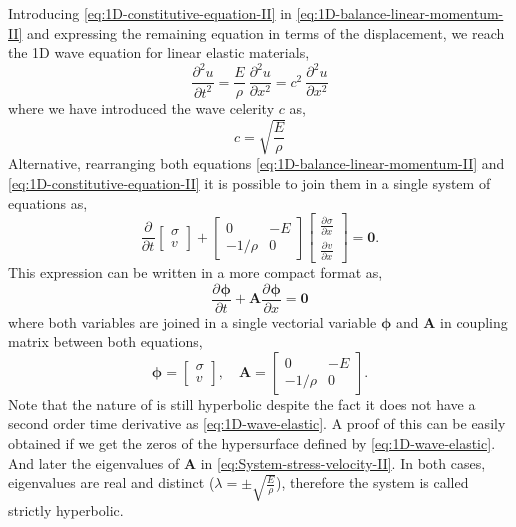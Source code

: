 \documentclass[preprint,12pt,a4paper]{elsarticle}
\newcommand{\Matrix}[1]{
  \ensuremath{\mathbf{{#1}}}
}
\newcommand{\Vector}[1]{
  \ensuremath{\mathbf{{#1}}}
}
\newcommand{\Deriv}[3][]{
  \ensuremath{\frac{\partial^{#1}{#2}}{ \partial {#3}^{#1} }}
}
\begin{document}
Introducing \eqref{eq:1D-constitutive-equation-II} in
\eqref{eq:1D-balance-linear-momentum-II} and expressing the remaining
equation in terms of the displacement, we reach the 1D wave
equation for linear elastic materials,
\begin{equation}
  \label{eq:1D-wave-elastic}
  \Deriv[2]{u}{t} = \frac{E}{\rho}\ \Deriv[2]{u}{x} = c^2\ \Deriv[2]{u}{x}
\end{equation}
where we have introduced the wave celerity $c$ as,
\begin{equation}
  \label{eq:1D-elastic-wave-celerity}
  c = \sqrt{\frac{E}{\rho}}
\end{equation}
Alternative, rearranging both equations
\eqref{eq:1D-balance-linear-momentum-II} and
\eqref{eq:1D-constitutive-equation-II} it is possible to join them in a
single system of equations as,
\begin{equation}
  \label{eq:System-stress-velocity}
  \Deriv{}{t} \left[
    \begin{array}{c}
      \sigma \\
      v
    \end{array}
  \right] + \left[
    \begin{array}{cc}
      0 & - E \\
      - 1/\rho & 0 
    \end{array} \right] \left[
    \begin{array}{c}
      \Deriv{\sigma}{x} \\
      \Deriv{v}{x}
    \end{array}
  \right] = \Vector{0}.
\end{equation}
This expression can be written in a more compact format as,
\begin{equation}
  \label{eq:System-stress-velocity-II}
  \Deriv{\Vector{\phi}}{t} + \Matrix{A}\Deriv{\Vector{\phi}}{x} = \Vector{0}
\end{equation}
where both variables are joined in a single vectorial variable
$\Vector{\phi}$ and $\Matrix{A}$ in coupling matrix between both equations,
\begin{equation*}
  \Vector{\phi} = \left[
    \begin{array}{c}
      \sigma \\
      v
    \end{array}
  \right],\quad 
  \Matrix{A} =  \left[
    \begin{array}{cc}
      0 & - E\\
      - 1/\rho & 0 
    \end{array} \right].
\end{equation*}
Note that the nature of \label{eq:eq:System-stress-velocity-II} is still
hyperbolic despite the fact it does not have a second order
time derivative as \eqref{eq:1D-wave-elastic}. A proof of this can
be easily obtained if we get the zeros of the hypersurface defined by
\eqref{eq:1D-wave-elastic}. And later the eigenvalues of $\Matrix{A}$
in \eqref{eq:System-stress-velocity-II}. In both cases, eigenvalues
are real and distinct ($\lambda = \pm \sqrt{\frac{E}{\rho}}$),
therefore the system is called strictly hyperbolic.
\end{document}

